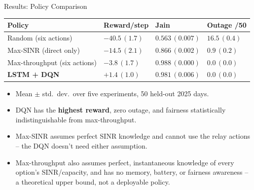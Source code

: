 \documentclass[aspectratio=169]{beamer}
\begin{document}
\begin{frame}{Results: Policy Comparison}
\footnotesize
\begin{table}
\centering
\begin{tabularx}{\linewidth}{|>{\raggedright\arraybackslash}X|>{\centering\arraybackslash}X|>{\centering\arraybackslash}X|>{\centering\arraybackslash}X|}
\hline
\textbf{Policy} & \textbf{Reward/step} & \textbf{Jain} & \textbf{Outage /50} \\
\hline
Random (six actions) & $-40.5\,(1.7)$ & $0.563\,(0.007)$ & $16.5\,(0.4)$ \\
\hline
Max-SINR (direct only) & $-14.5\,(2.1)$ & $0.866\,(0.002)$ & $0.9\,(0.2)$ \\
\hline
Max-throughput (six actions) & $-3.8\,(1.7)$ & $\mathbf{0.988}\,(0.000)$ & $\mathbf{0.0}\,(0.0)$ \\
\hline
\textbf{LSTM + DQN} & $\mathbf{+1.4}\,(1.0)$ & $0.981\,(0.006)$ & $\mathbf{0.0}\,(0.0)$ \\
\hline
\end{tabularx}
\end{table}
\begin{itemize}
  \item Mean $\pm$ std.\ dev.\ over five experiments, 50 held-out 2025 days.
  \item DQN has the \textbf{highest reward}, zero outage, and fairness
        statistically indistinguishable from max-throughput.
  \item Max-SINR assumes perfect SINR knowledge and cannot use the relay
        actions -- the DQN doesn't need either assumption.
  \item Max-throughput also assumes perfect, instantaneous knowledge of
        every option's SINR/capacity, and has no memory, battery, or
        fairness awareness -- a theoretical upper bound, not a
        deployable policy.
\end{itemize}
\end{frame}
\end{document}
